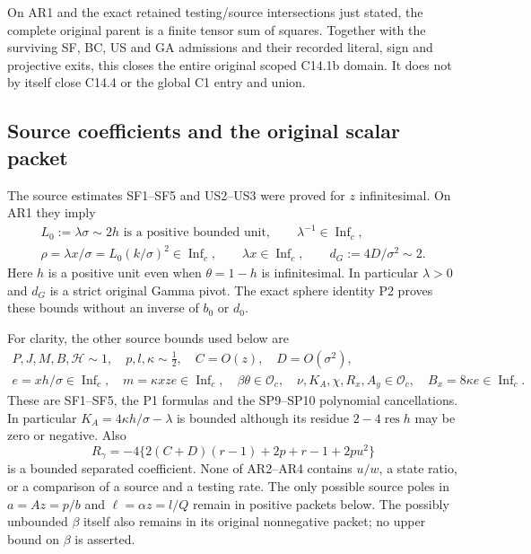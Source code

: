 \begin{theorem}
On AR1 and the exact retained testing/source intersections just
stated, the complete original parent is a finite tensor sum of
squares. Together with the surviving SF, BC, US and GA admissions
and their recorded literal, sign and projective exits, this closes
the entire original scoped C14.1b domain. It does not by itself
close C14.4 or the global C1 entry and union.
\end{theorem}

\subsection{Source coefficients and the original scalar packet}

The source estimates SF1--SF5 and US2--US3 were proved for
$z$ infinitesimal. On AR1 they imply
\[
 \begin{gathered}
 L_0:=\lambda\sigma\sim2h\text{ is a positive bounded unit},
 \qquad \lambda^{-1}\in\operatorname{Inf}_c,\\
 \rho=\lambda x/\sigma=L_0(k/\sigma)^2\in\operatorname{Inf}_c,
 \qquad \lambda x\in\operatorname{Inf}_c,
 \qquad d_G:=4D/\sigma^2\sim2. 
 \end{gathered} \tag{AR2}
\]
Here $h$ is a positive unit even when $\theta=1-h$ is
infinitesimal. In particular $\lambda>0$ and $d_G$ is a strict
original Gamma pivot. The exact sphere identity P2 proves these
bounds without an inverse of $b_0$ or $d_0$.

For clarity, the other source bounds used below are
\[
 \begin{gathered}
 P,J,M,B,\mathcal H\sim1,\quad p,l,\kappa\sim\tfrac12,
 \quad C=O(z),\quad D=O(\sigma^2),\\
 e=xh/\sigma\in\operatorname{Inf}_c,\quad
 m=\kappa xze\in\operatorname{Inf}_c,\quad
 \beta\theta\in\mathcal O_c,\quad
 \nu,K_A,\chi,R_x,A_y\in\mathcal O_c,
 \quad B_x=8\kappa e\in\operatorname{Inf}_c.
 \end{gathered} \tag{AR3}
\]
These are SF1--SF5, the P1 formulas and the SP9--SP10 polynomial
cancellations. In particular $K_A=4\kappa h/\sigma-\lambda$
is bounded although its residue $2-4\operatorname{res}h$ may be
zero or negative. Also
\[
 R_\gamma=-4\{2(C+D)(r-1)+2p+r-1+2pu^2\}
 \tag{AR4}
\]
is a bounded separated coefficient. None of AR2--AR4 contains
$u/w$, a state ratio, or a comparison of a source and a testing
rate. The only possible source poles in $a=Az=p/b$ and
$\ell=\alpha z=l/Q$ remain in positive packets below. The
possibly unbounded $\beta$ itself also remains in its original
nonnegative packet; no upper bound on $\beta$ is asserted.

